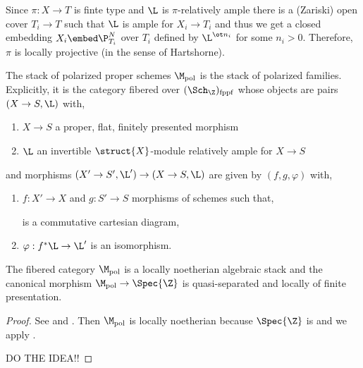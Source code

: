\documentclass[12pt]{article}
\begin{document}
\begin{rmk}
Since $\pi : X \to T$ is finte type and $\L$ is $\pi$-relatively ample there is a (Zariski) open cover $T_i \to T$ such that $\L$ is ample for $X_i \to T_i$ and thus we get a closed embedding $X_i \embed \P^N_{T_i}$ over $T_i$ defined by $\L^{\ot n_i}$ for some $n_i > 0$. Therefore, $\pi$ is locally projective (in the sense of Hartshorne). 
\end{rmk}

\newcommand{\pol}{\mathrm{pol}}
\newcommand{\fppf}{\mathrm{fppf}}


\begin{defn}
The stack of polarized proper schemes $\M_{\pol}$ is the stack of polarized families. Explicitly, it is the category fibered over $(\Sch_{\Z})_{\fppf}$ whose objects are pairs $(X \to S, \L)$ with,
\begin{enumerate}
\item $X \to S$ a proper, flat, finitely presented morphism
\item $\L$ an invertible $\struct{X}$-module relatively ample for $X \to S$
\end{enumerate}
and morphisms $(X' \to S', \L') \to (X \to S, \L)$ are given by $(f,g,\varphi)$ with,
\begin{enumerate}
\item $f : X' \to X$ and $g : S' \to S$ morphisms of schemes such that,
\begin{center}
\end{center}
is a commutative cartesian diagram,
\item $\varphi : f^* \L \to \L'$ is an isomorphism.
\end{enumerate}
\end{defn}

\begin{thm}
The fibered category $\M_{\pol}$ is a locally noetherian algebraic stack and the canonical morphism $\M_{\pol} \to \Spec{\Z}$ is quasi-separated and locally of finite presentation.
\end{thm}

\begin{proof}
See  and .
Then $\M_{\pol}$ is locally noetherian because $\Spec{\Z}$ is and we apply . 

DO THE IDEA!!
\end{proof}
\end{document}
